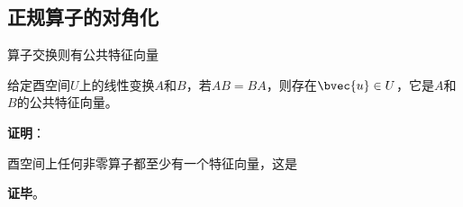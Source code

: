 \subsection{正规算子的对角化}



\begin{lemma}{算子交换则有公共特征向量}

给定酉空间$U$上的线性变换$A$和$B$，若$AB=BA$，则存在$\bvec{u}\in U$，它是$A$和$B$的公共特征向量。

\end{lemma}


\textbf{证明}：

酉空间上任何非零算子都至少有一个特征向量，这是

\textbf{证毕}。
























